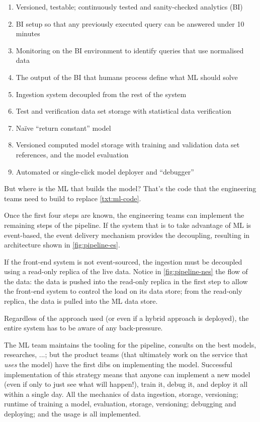 \documentclass[10 pt, twocolumn]{article}
\begin{document}
\begin{enumerate}
  \item Versioned, testable; continuously tested and sanity-checked analytics (BI)
  \item BI setup so that any previously executed query can be answered under 10 minutes
  \item Monitoring on the BI environment to identify queries that use normalised data
  \item The output of the BI that humans process define what ML should solve
  \item Ingestion system decoupled from the rest of the system
  \item Test and verification data set storage with statistical data verification
  \label{txt:ml-code}\item Naïve ``return constant'' model
  \item Versioned computed model storage with training and validation data set references, and the model evaluation
  \item Automated or single-click model deployer and ``debugger''
\end{enumerate}

But where is the ML that builds the model? That's the code that the engineering teams need to build to replace \autoref{txt:ml-code}. 

Once the first four steps are known, the engineering teams can implement the remaining steps of the pipeline. If the system that is to take advantage of ML is event-based, the event delivery mechanism provides the decoupling, resulting in architecture shown in \autoref{fig:pipeline-es}.


If the front-end system is not event-sourced, the ingestion must be decoupled using a read-only replica of the live data. Notice in \autoref{fig:pipeline-nes} the flow of the data: the data is pushed into the read-only replica in the first step to allow the front-end system to control the load on its data store; from the read-only replica, the data is pulled into the ML data store. 


Regardless of the approach used (or even if a hybrid approach is deployed), the entire system has to be aware of any back-pressure.

The ML team maintains the tooling for the pipeline, consults on the best models, researches, ...; but the product teams (that ultimately work on the service that \emph{uses} the model) have the first dibs on implementing the model. Successful implementation of this strategy means that anyone can implement a new model (even if only to just see what will happen!), train it, debug it, and deploy it all within a single day. All the mechanics of data ingestion, storage, versioning; runtime of training a model, evaluation, storage, versioning; debugging and deploying; and the usage is all implemented. 
\end{document}
